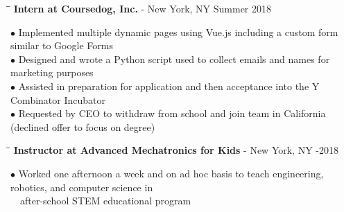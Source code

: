 \documentclass{res}
\begin{document}
\begin{resume}
    
   \begin{tabbing}
   \hspace{2.3in}\= \hspace{3.8in}\= \kill
    {\bf Intern at Coursedog, Inc.} - New York, NY   \>  \>Summer 2018
   \end{tabbing}\vspace{-20pt}
    $\bullet$ Implemented multiple dynamic pages using Vue.js including a custom form similar to Google Forms\\
    $\bullet$ Designed and wrote a Python script used to collect emails and names for marketing purposes\\
    $\bullet$ Assisted in preparation for application and then acceptance into the Y Combinator Incubator\\
    $\bullet$ Requested by CEO to withdraw from school and join team in California (declined offer to focus on degree)
   \vspace{-15pt}
   \begin{tabbing}
   \hspace{2.3in}\= \hspace{4in}\= \kill
   {\bf Instructor at Advanced Mechatronics for Kids} - New York, NY   \>  -2018
   \end{tabbing}\vspace{-20pt}
    $\bullet$ Worked one afternoon a week and on ad hoc basis to teach engineering, robotics, and computer
	science in\\$~~~$ after-school STEM educational program



\vspace{-0.1in}

\end{resume}
\end{document}
